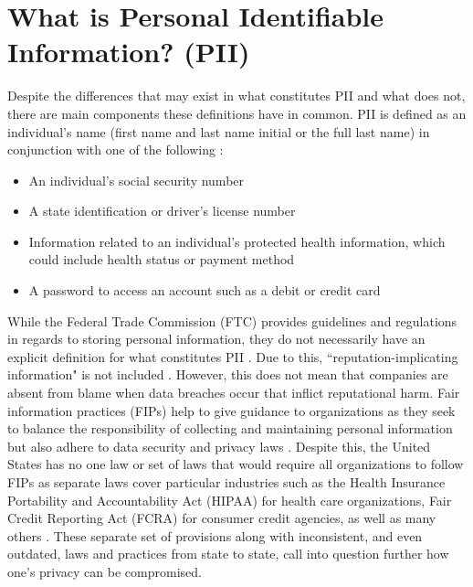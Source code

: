 \documentclass[sigconf]{acmart}
\begin{document}
\section{What is Personal Identifiable Information? (PII)}
Despite the differences that may exist in what constitutes PII and what does not, there are main components these definitions have in common. PII is defined as an individual's name (first name and last name initial or the full last name) in conjunction with one of the following \cite{Agelidis2016}:
\begin{itemize}
  \item An individual's social security number 
  \item A state identification or driver's license number
  \item Information related to an individual's protected health information, which could include health status or payment method
  \item A password to access an account such as a debit or credit card
\end{itemize} 
While the Federal Trade Commission (FTC) provides guidelines and regulations in regards to storing personal information, they do not necessarily have an explicit definition for what constitutes PII \cite{Agelidis2016}. Due to this, ``reputation-implicating information" is not included \cite{Agelidis2016}. However, this does not mean that companies are absent from blame when data breaches occur that inflict reputational harm. Fair information practices (FIPs) help to give guidance to organizations as they seek to balance the responsibility of collecting and maintaining personal information but also adhere to data security and privacy laws \cite{Culnan2009}. Despite this, the United States has no one law or set of laws that would require all organizations to follow FIPs as separate laws cover particular industries such as the Health Insurance Portability and Accountability Act (HIPAA) for health care organizations, Fair Credit Reporting Act (FCRA) for consumer credit agencies, as well as many others \cite{Culnan2009}. These separate set of provisions along with inconsistent, and even outdated, laws and practices from state to state, call into question further how one's privacy can be compromised.
\end{document}
